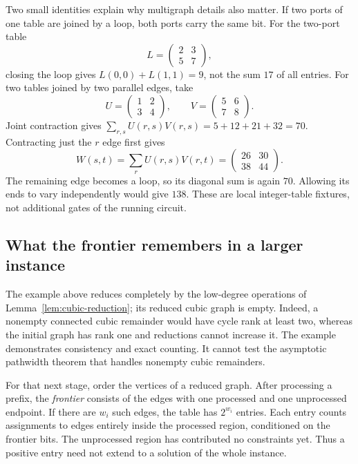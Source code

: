 Two small identities explain why multigraph details also matter. If two
ports of one table are joined by a loop, both ports carry the same bit.
For the two-port table
\[
 L=\begin{pmatrix}2&3\\5&7\end{pmatrix},
\]
closing the loop gives $L(0,0)+L(1,1)=9$, not the sum $17$ of all entries.
For two tables joined by two parallel edges, take
\[
 U=\begin{pmatrix}1&2\\3&4\end{pmatrix},\qquad
 V=\begin{pmatrix}5&6\\7&8\end{pmatrix}.
\]
Joint contraction gives $\sum_{r,s}U(r,s)V(r,s)=5+12+21+32=70$.
Contracting just the $r$ edge first gives
\[
 W(s,t)=\sum_r U(r,s)V(r,t)
       =\begin{pmatrix}26&30\\38&44\end{pmatrix}.
\]
The remaining edge becomes a loop, so its diagonal sum is again $70$.
Allowing its ends to vary independently would give $138$. These are local
integer-table fixtures, not additional gates of the running circuit.

\subsection{What the frontier remembers in a larger instance}

The example above reduces completely by the low-degree operations of
Lemma~\ref{lem:cubic-reduction}; its reduced cubic graph is empty. Indeed,
a nonempty connected cubic remainder would have cycle rank at least two,
whereas the initial graph has rank one and reductions cannot increase it.
The example demonstrates consistency and exact counting. It cannot test the
asymptotic pathwidth theorem that handles nonempty cubic remainders.

For that next stage, order the vertices of a reduced graph. After processing
a prefix, the \emph{frontier} consists of the edges with one processed and
one unprocessed endpoint. If there are $w_i$ such edges, the table has
$2^{w_i}$ entries. Each entry counts assignments to edges entirely inside
the processed region, conditioned on the frontier bits. The unprocessed
region has contributed no constraints yet. Thus a positive entry need not
extend to a solution of the whole instance.

